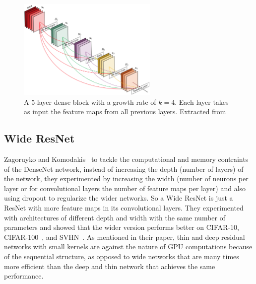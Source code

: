 \begin{figure}[]
    \begin{center}
    \includegraphics[width=0.6\textwidth]{images/DenseNet.png}
    \end{center}
    \caption{A 5-layer dense block with a growth rate of $k = 4$. Each layer takes as input the feature maps from all previous layers. Extracted from~\cite{huang2017densely}}\label{fig:DenseNet}
\end{figure}

\subsection{Wide ResNet}
Zagoruyko and Komodakis~\cite{zagoruyko2016wide} to tackle the computational and memory contraints of the DenseNet network, instead of increasing the  depth (number of layers) of the network, they experimented by increasing the width (number of neurons per layer or for convolutional layers the number of feature maps per layer) and also using dropout to regularize the wider networks. So a Wide ResNet is just a ResNet with more feature maps in its convolutional layers. They experimented with architectures of different depth and width with the same number of parameters and showed that the wider version performs better on CIFAR-10, CIFAR-100~\cite{krizhevsky2009learning}, and SVHN~\cite{netzer2011reading}. As mentioned in their paper, thin and deep residual networks with small kernels are against the nature of GPU computations because of the sequential structure, as opposed to wide networks that are many times more efficient than the deep and thin network that achieves the same performance. 

